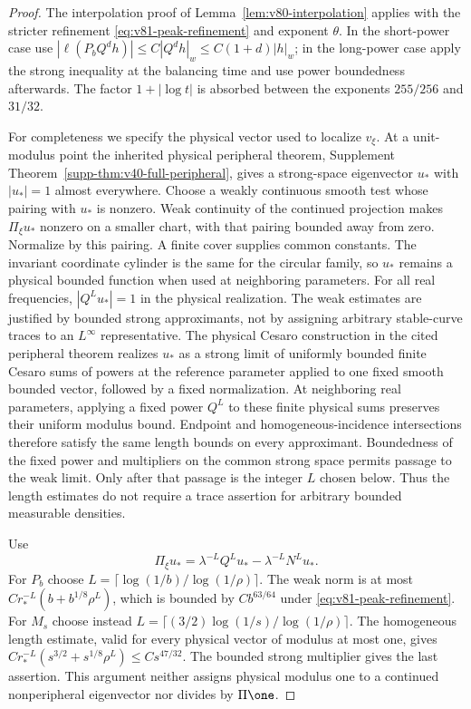 \begin{proof}
The interpolation proof of Lemma~\ref{lem:v80-interpolation} applies
with the stricter refinement \eqref{eq:v81-peak-refinement} and
exponent $\theta$. In the short-power case use
$|\ell(P_bQ^dh)|\le C|Q^dh|_w\le C(1+d)|h|_w$;
in the long-power case apply the strong inequality at the balancing
time and use power boundedness afterwards. The factor $1+|\log t|$
is absorbed between the exponents $255/256$ and $31/32$.

For completeness we specify the physical vector used to localize
$v_\xi$. At a unit-modulus point the inherited physical peripheral
 theorem, Supplement Theorem~\ref{supp-thm:v40-full-peripheral}, gives
a strong-space eigenvector $u_*$ with $|u_*|=1$ almost everywhere.
Choose a weakly continuous smooth test whose pairing with $u_*$ is
nonzero. Weak continuity of the continued projection makes
$\Pi_\xi u_*$ nonzero on a smaller chart, with that pairing bounded
away from zero. Normalize by this pairing. A finite cover supplies
common constants. The invariant coordinate cylinder is the same
for the circular family, so $u_*$ remains a physical bounded function
when used at neighboring parameters. For all real frequencies,
$|Q^Lu_*|=1$ in the physical realization.
The weak estimates are justified by bounded strong approximants,
not by assigning arbitrary stable-curve traces to an $L^\infty$
representative. The physical Cesaro construction in the cited
peripheral theorem realizes $u_*$ as a strong limit of uniformly
bounded finite Cesaro sums of powers at the reference parameter
applied to one fixed smooth bounded vector, followed by a fixed
normalization. At neighboring real parameters, applying a fixed
power $Q^L$ to these finite physical sums preserves their uniform
modulus bound. Endpoint and homogeneous-incidence intersections
therefore satisfy the same length bounds on every approximant.
Boundedness of the fixed power and multipliers on the common strong
space permits passage to the weak limit. Only after that passage
is the integer $L$ chosen below. Thus the length estimates do not
require a trace assertion for arbitrary bounded measurable densities.

Use
\[
 \Pi_\xi u_*=\lambda^{-L}Q^Lu_*-\lambda^{-L}N^Lu_*.
\]
For $P_b$ choose $L=\lceil\log(1/b)/\log(1/\rho)\rceil$.
The weak norm is at most $Cr_*^{-L}(b+b^{1/8}\rho^L)$,
which is bounded by $Cb^{63/64}$ under
\eqref{eq:v81-peak-refinement}. For $M_s$ choose instead
$L=\lceil(3/2)\log(1/s)/\log(1/\rho)\rceil$.
The homogeneous length estimate, valid for every physical vector
of modulus at most one, gives
$Cr_*^{-L}(s^{3/2}+s^{1/8}\rho^L)\le Cs^{47/32}$.
The bounded strong multiplier gives the last assertion. This
argument neither assigns physical modulus one to a continued
nonperipheral eigenvector nor divides by $\Pi\one$.
\end{proof}

